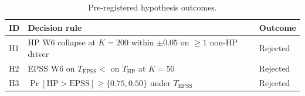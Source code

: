 \begin{table}[!t]
 \caption{Pre-registered hypothesis outcomes.}
 \label{tab:hypotheses}
 \centering
 \small
 \setlength{\tabcolsep}{4pt}
 \begin{tabular}{@{}p{0.5cm}p{4.8cm}p{2.2cm}@{}}
 \toprule
 \textbf{ID} & \textbf{Decision rule} & \textbf{Outcome} \\
 \midrule
 H1 & HP W6 collapse at $K=200$ within $\pm 0.05$ on $\geq 1$ non-HP driver & Rejected \\
 H2 & EPSS W6 on $T_{\mathrm{EPSS}}<$ on $T_{\mathrm{HP}}$ at $K=50$ & Rejected \\
 H3 & $\Pr[\mathrm{HP}>\mathrm{EPSS}]\geq\{0.75,0.50\}$ under $T_{\mathrm{EPSS}}$ & Rejected \\
 \bottomrule
 \end{tabular}
\end{table}
